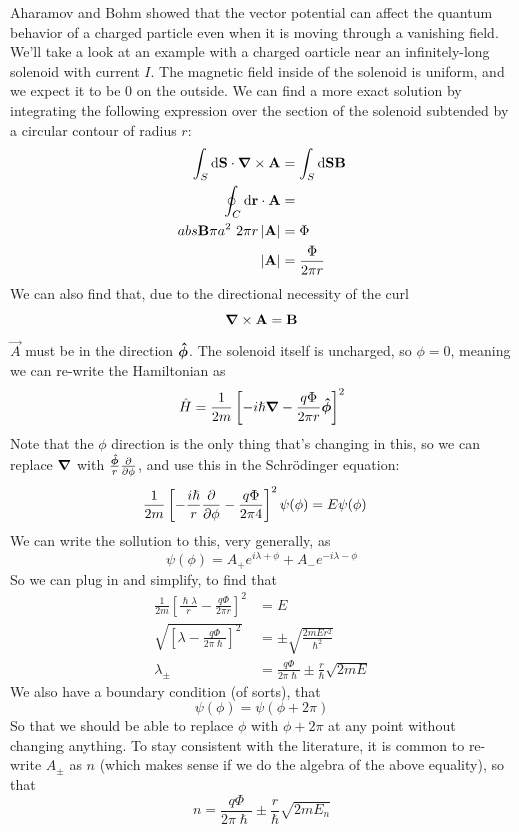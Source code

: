 \documentclass[a4paper]{article}
\begin{document}
Aharamov and Bohm showed that the vector potential can affect the quantum
behavior of a charged particle even when it is moving through a vanishing
field.\\
We'll take a look at an example with a charged oarticle near an infinitely-long
solenoid with current $I$. The magnetic field inside of the solenoid is
uniform, and we expect it to be $0$ on the outside. We can find a more exact
solution by integrating the following expression over the section of the
solenoid subtended by a circular contour of radius $r$:
\begin{align*}
	\int_S \mathrm{d}\boldsymbol{\mathbf{S}}\cdot\boldsymbol{\mathbf{\nabla}}\times\boldsymbol{\mathbf{A}} &= \int_S\mathrm{d}\boldsymbol{\mathbf{S}} \boldsymbol{\mathbf{B}}\\
	\oint_C\mathrm{d}\boldsymbol{\mathbf{r}}\cdot\boldsymbol{\mathbf{A}} &= \\abs{\boldsymbol{\mathbf{B}}}\pi a^2\
	2\pi r \left\lvert \boldsymbol{\mathbf{A}}\right\rvert &= \Phi\\
	\left\lvert \boldsymbol{\mathbf{A}}\right\rvert &= \frac{\Phi}{2\pi r}
\end{align*}
We can also find that, due to the directional necessity of the curl
\[
	\boldsymbol{\mathbf{\nabla}}\times\boldsymbol{\mathbf{A}} = \boldsymbol{\mathbf{B}}
\]
$\vec{A}$ must be in the direction $\boldsymbol{\mathbf{\hat{\phi}}}$.
The solenoid itself is uncharged, so $\phi=0$, meaning we can re-write the
Hamiltonian as
\[
	\hat{H} = \frac{1}{2m}\left[-i\hslash\boldsymbol{\mathbf{\nabla}} - \frac{q\Phi}{2\pi
	r}\boldsymbol{\mathbf{\hat{\phi}}}\right]^2
\]
Note that the $\phi$ direction is the only thing that's
changing in this, so we can replace $\boldsymbol{\mathbf{\nabla}}$ with
$\frac{\vhat{\phi}}{r}\pd{\phi}$, and use this in the
Schr\"odinger equation:
\begin{align*}
	\frac{1}{2m}\left[-\frac{i\hslash}{r}\pd{\phi} -
	\frac{q\Phi}{2\pi 4}\right]^2\psi(\phi) &= E\psi(\phi)
\end{align*}
We can write the sollution to this, very generally, as
\[
	\psi(\phi) = A_+ e^{i\lambda+\phi} + A_-e^{-i\lambda-\phi}
\]
So we can plug in and simplify, to find that
\begin{align*}
	\frac{1}{2m}\left[\frac{\hslash\lambda}{r} - \frac{q\Phi}{2\pi r}
	\right]^2 &= E\\
	\sqrt{\left[\lambda-\frac{q\Phi}{2\pi\hslash}\right]^2} &= \pm
		\sqrt{\frac{2mEr^2}{\hslash^2}}\\
	\lambda_{\pm} &= \frac{q\Phi}{2\pi\hslash} \pm
		\frac{r}{\hslash}\sqrt{2mE}
\end{align*}
We also have a boundary condition (of sorts), that
\[
	\psi(\phi) = \psi(\phi+2\pi)
\]
So that we should be able to replace $\phi$ with $\phi+2\pi$ at any point
without changing anything. To stay consistent with the literature, it is common
to re-write $A_\pm$ as $n$ (which makes sense if we do the algebra of the above
equality), so that
\[
	n = \frac{q\Phi}{2\pi\hslash} \pm \frac{r}{\hslash} \sqrt{2mE_n}
\]
\end{document}
